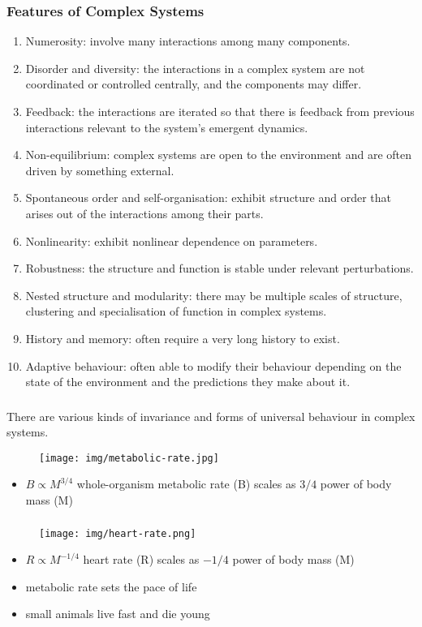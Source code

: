 \documentclass[UTF8,11pt,colorlinks,compress,openany]{beamer}%
\begin{document}
\begin{frame}\frametitle{Features of Complex Systems}
\begin{enumerate}
	\item Numerosity: involve many interactions among many components.
	\item Disorder and diversity: the interactions in a complex system are not coordinated or controlled centrally, and the components may differ.
	\item Feedback: the interactions are iterated so that there is feedback from previous interactions relevant to the system's emergent dynamics.
	\item Non-equilibrium: complex systems are open to the environment and are often driven by something external.
	\item Spontaneous order and self-organisation: exhibit structure and order that arises out of the interactions among their parts.
	\item Nonlinearity: exhibit nonlinear dependence on parameters.
	\item Robustness: the structure and function is stable under relevant perturbations.
	\item Nested structure and modularity: there may be multiple scales of structure, clustering and specialisation of function in complex systems.
	\item History and memory: often require a very long history to exist.
	\item Adaptive behaviour: often able to modify their behaviour depending on the state of the environment and the predictions they make about it.
\end{enumerate}	
\end{frame}

\begin{frame}\frametitle{}
There are various kinds of invariance and forms of universal behaviour in complex systems.
\begin{figure}[H]
\texttt{[image: img/metabolic-rate.jpg]}
\end{figure}
\begin{itemize}
	\item $B\propto M^{3/4}$ whole-organism metabolic rate (B) scales as $3/4$ power of body mass (M)
\end{itemize}
\end{frame}

\begin{frame}\frametitle{}
\begin{figure}[H]
\texttt{[image: img/heart-rate.png]}	
\end{figure}
\begin{itemize}
	\item $R\propto M^{-1/4}$ heart rate (R) scales as $-1/4$ power of body mass (M)
	\item metabolic rate sets the pace of life
	\item small animals live fast and die young
\end{itemize}
\end{frame}
\end{document}
